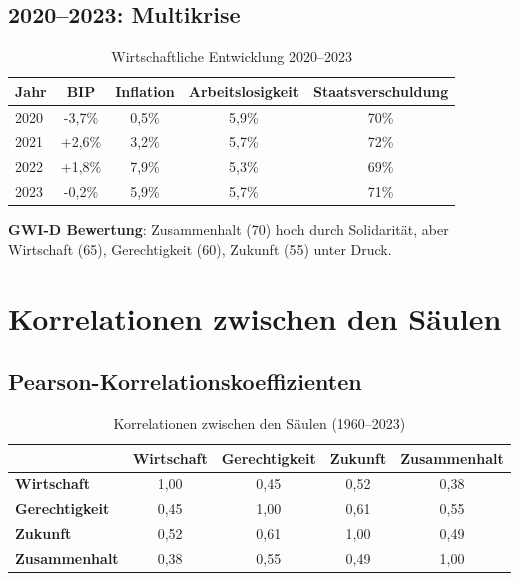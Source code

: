 \subsection{2020--2023: Multikrise}

\begin{table}[h]
\centering
\begin{tabular}{lcccc}
\toprule
\textbf{Jahr} & \textbf{BIP} & \textbf{Inflation} & \textbf{Arbeitslosigkeit} & \textbf{Staatsverschuldung} \\
\midrule
2020 & -3,7\% & 0,5\% & 5,9\% & 70\% \\
2021 & +2,6\% & 3,2\% & 5,7\% & 72\% \\
2022 & +1,8\% & 7,9\% & 5,3\% & 69\% \\
2023 & -0,2\% & 5,9\% & 5,7\% & 71\% \\
\bottomrule
\end{tabular}
\caption{Wirtschaftliche Entwicklung 2020--2023}
\label{tab:2020-2023}
\end{table}

\textbf{GWI-D Bewertung}: Zusammenhalt (70) hoch durch Solidarität, aber Wirtschaft (65), Gerechtigkeit (60), Zukunft (55) unter Druck.

\section{Korrelationen zwischen den Säulen}

\subsection{Pearson-Korrelationskoeffizienten}

\begin{table}[h]
\centering
\begin{tabular}{lcccc}
\toprule
 & \textbf{Wirtschaft} & \textbf{Gerechtigkeit} & \textbf{Zukunft} & \textbf{Zusammenhalt} \\
\midrule
\textbf{Wirtschaft} & 1,00 & 0,45 & 0,52 & 0,38 \\
\textbf{Gerechtigkeit} & 0,45 & 1,00 & 0,61 & 0,55 \\
\textbf{Zukunft} & 0,52 & 0,61 & 1,00 & 0,49 \\
\textbf{Zusammenhalt} & 0,38 & 0,55 & 0,49 & 1,00 \\
\bottomrule
\end{tabular}
\caption{Korrelationen zwischen den Säulen (1960--2023)}
\label{tab:korrelationen-saeulen}
\end{table}


